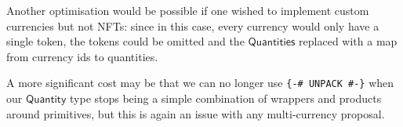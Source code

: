 \documentclass[a4paper]{article}
\newcommand{\s}{\textsf}  %
\newcommand{\qty}{\ensuremath{\s{Quantity}}}
\newcommand{\qtymap}{\ensuremath{\s{Quantities}}}
\begin{document}
\smallskip  Another optimisation would be possible if one wished to
implement custom currencies but not NFTs: since in this case, every
currency would only have a single token, the tokens could be omitted
and the \qtymap{} replaced with a map from currency ids to quantities.

\smallskip A more significant cost may be that we can no longer use
\verb|{-# UNPACK #-}| when our \qty{} type stops being a simple
combination of wrappers and products around primitives, but this is
again an issue with any multi-currency proposal.


\end{document}
